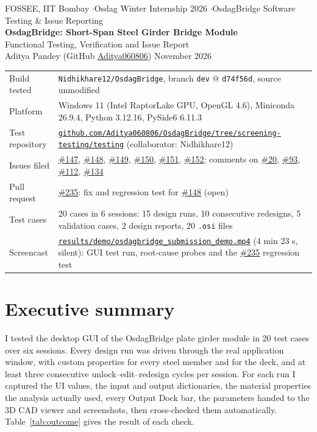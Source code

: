 \documentclass[11pt,a4paper]{article}
\newcommand{\issue}[1]{\href{https://github.com/Nidhikhare12/OsdagBridge/issues/#1}{\##1}}
\newcommand{\ev}[1]{\href{https://github.com/Aditya060806/OsdagBridge/tree/screening-testing/testing/#1}{\nolinkurl{#1}}}
\begin{document}
\raggedright

\begin{center}
{\sffamily\small FOSSEE, IIT Bombay \quad$\cdot$\quad Osdag Winter Internship 2026 \quad$\cdot$\quad OsdagBridge Software Testing \& Issue Reporting}\\[10pt]
{\LARGE\bfseries\sffamily OsdagBridge: Short-Span Steel Girder Bridge Module}\\[5pt]
{\large Functional Testing, Verification and Issue Report}\\[10pt]
Aditya Pandey \quad (GitHub \href{https://github.com/Aditya060806}{Aditya060806})  November 2026
\end{center}
\vspace{2pt}
\begin{tabularx}{\linewidth}{@{}lY@{}}
\toprule
Build tested & \texttt{Nidhikhare12/OsdagBridge}, branch \texttt{dev} @ \texttt{d74f56d}, source unmodified \\
Platform & Windows 11 (Intel RaptorLake GPU, OpenGL 4.6), Miniconda 26.9.4, Python 3.12.16, PySide6 6.11.3 \\
Test repository & \href{https://github.com/Aditya060806/OsdagBridge/tree/screening-testing/testing}{\nolinkurl{github.com/Aditya060806/OsdagBridge/tree/screening-testing/testing}} (collaborator: Nidhikhare12) \\
Issues filed & \issue{147}, \issue{148}, \issue{149}, \issue{150}, \issue{151}, \issue{152}; comments on \issue{20}, \issue{93}, \issue{112}, \issue{134} \\
Pull request & \issue{235}: fix and regression test for \issue{148} (open) \\
Test cases & 20 cases in 6 sessions: 15 design runs, 10 consecutive redesigns, 5 validation cases, 2 design reports, 20 \texttt{.osi} files \\
Screencast & \ev{results/demo/osdagbridge_submission_demo.mp4} (4 min 23 s, silent): GUI test run, root-cause probes and
the \issue{235} regression test \\
\bottomrule
\end{tabularx}

\section{Executive summary}
I tested the desktop GUI of the OsdagBridge plate girder module in 20 test cases over six sessions. Every design run was
driven through the real application window, with custom properties for every steel member and for the deck, and at least
three consecutive unlock--edit--redesign cycles per session. For each run I captured the UI values, the input and output
dictionaries, the material properties the analysis actually used, every Output Dock bar, the parameters handed to the 3D CAD
viewer and screenshots, then cross-checked them automatically. Table~\ref{tab:outcome} gives the result of each check.
\end{document}
